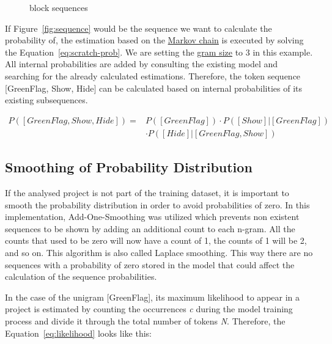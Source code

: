 \begin{figure}%
    \centering
    \qquad
    \caption[\scratch{} block sequences]{\label{fig:sequences}\scratch{} block sequences}%
\end{figure}

If Figure~\ref{fig:sequence} would be the sequence we want to calculate the probability of, the estimation based on the \hyperref[def:markov_chain]{Markov chain} is executed by solving the Equation~\ref{eq:scratch-prob}. We are setting the \hyperref[def:gram size]{gram size} to 3 in this example. All internal probabilities are added by consulting the existing model and searching for the already calculated estimations. Therefore, the token sequence [GreenFlag, Show, Hide] can be calculated based on internal probabilities of its existing subsequences.

\begin{equation} \label{eq:scratch-prob}
\begin{aligned}
P([GreenFlag, Show, Hide]) ={} & P([GreenFlag])\cdot P([Show]|[GreenFlag]) \\
							  & \cdot P([Hide]|[GreenFlag, Show])
\end{aligned}
\end{equation}


\subsection{Smoothing of Probability Distribution}\label{subsec:smoothing}
If the analysed project is not part of the training dataset, it is important to smooth the probability distribution in order to avoid probabilities of zero. In this implementation, Add-One-Smoothing was utilized which prevents non existent sequences to be shown by adding an additional count to each n-gram.
All the counts that used to be zero will now have a count of 1, the counts of 1 will be 2, and so on. This algorithm is also called Laplace smoothing. This way there are no sequences with a probability of zero stored in the model that could affect the calculation of the sequence probabilities.

In the case of the unigram [GreenFlag], its maximum likelihood to appear in a \scratch{} project is estimated by counting the occurrences \textit{c} during the model training process and divide it through the total number of tokens \textit{N}. Therefore, the Equation~\ref{eq:likelihood} looks like this:

